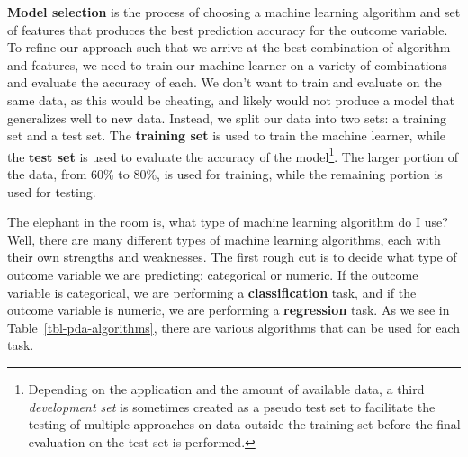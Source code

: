 \documentclass[
  letterpaper,
  DIV=11,
  numbers=noendperiod]{scrreport}
\theoremstyle{definition}
\theoremstyle{remark}
\begin{document}
\textbf{Model selection} is the process of choosing a machine learning
algorithm and set of features that produces the best prediction accuracy
for the outcome variable. To refine our approach such that we arrive at
the best combination of algorithm and features, we need to train our
machine learner on a variety of combinations and evaluate the accuracy
of each. We don't want to train and evaluate on the same data, as this
would be cheating, and likely would not produce a model that generalizes
well to new data. Instead, we split our data into two sets: a training
set and a test set. The \textbf{training set} is used to train the
machine learner, while the \textbf{test set} is used to evaluate the
accuracy of the model\footnote{Depending on the application and the
  amount of available data, a third \emph{development set} is sometimes
  created as a pseudo test set to facilitate the testing of multiple
  approaches on data outside the training set before the final
  evaluation on the test set is performed.}. The larger portion of the
data, from 60\% to 80\%, is used for training, while the remaining
portion is used for testing.

The elephant in the room is, what type of machine learning algorithm do
I use? Well, there are many different types of machine learning
algorithms, each with their own strengths and weaknesses. The first
rough cut is to decide what type of outcome variable we are predicting:
categorical or numeric. If the outcome variable is categorical, we are
performing a \textbf{classification} task, and if the outcome variable
is numeric, we are performing a \textbf{regression} task. As we see in
Table~\ref{tbl-pda-algorithms}, there are various algorithms that can be
used for each task.
\end{document}
